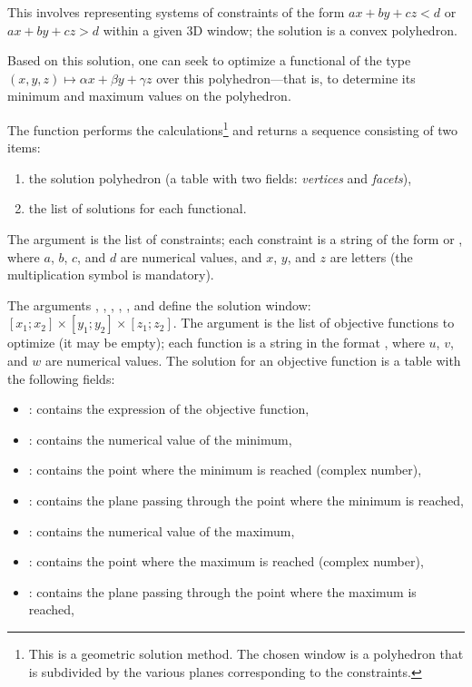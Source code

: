 This involves representing systems of constraints of the form $ax+by+cz<d$ or $ax+by+cz>d$ within a given 3D window; the solution is a convex polyhedron.

Based on this solution, one can seek to optimize a functional of the type $(x,y,z)\mapsto \alpha x+\beta y+\gamma z$ over this polyhedron—that is, to determine its minimum and maximum values ​​on the polyhedron.

The function  performs the calculations\footnote{This is a geometric solution method. The chosen window is a polyhedron that is subdivided by the various planes corresponding to the constraints.} and returns a sequence consisting of two items:
\begin{enumerate}
    \item the solution polyhedron (a table with two fields: \emph{vertices} and \emph{facets}),
    \item the list of solutions for each functional. 
\end{enumerate}

The  argument is the list of constraints; each constraint is a string of the form  or , where $a$, $b$, $c$, and $d$ are numerical values, and $x$, $y$, and $z$ are letters (the multiplication symbol is mandatory).

The arguments , , , , , and  define the solution window: $[x_1;x_2]\times [y_1;y_2]\times [z_1;z_2]$. The  argument is the list of objective functions to optimize (it may be empty); each function is a string in the format , where $u$, $v$, and $w$ are numerical values. The solution for an objective function is a table with the following fields:
\begin{itemize}
    \item {}: contains the expression of the objective function,
    \item {}: contains the numerical value of the minimum,
    \item {}: contains the point where the minimum is reached (complex number),
    \item {}: contains the plane passing through the point where the minimum is reached,
    \item {}: contains the numerical value of the maximum,
    \item {}: contains the point where the maximum is reached (complex number),
    \item {}: contains the plane passing through the point where the maximum is reached,
\end{itemize}

